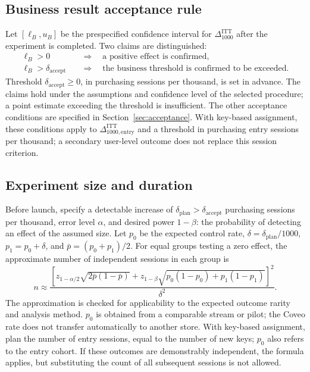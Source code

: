 \documentclass[12pt,a4paper]{article}
\theoremstyle{plainru}
\begin{document}
\subsection{Business result acceptance rule}\label{sec:eval-acceptance}

Let $[\ell_B,u_B]$ be the prespecified confidence interval
for $\Delta_{1000}^{\mathrm{ITT}}$ after the experiment is completed.
Two claims are distinguished:
\begin{align}
 \ell_B>0
 &\quad\Longrightarrow\quad
 \text{a positive effect is confirmed},
 \label{eq:eval-positive-acceptance}\\
 \ell_B>\delta_{\mathrm{accept}}
 &\quad\Longrightarrow\quad
 \text{the business threshold is confirmed to be exceeded}.
 \label{eq:eval-business-acceptance}
\end{align}
Threshold $\delta_{\mathrm{accept}}\ge0$, in purchasing sessions per thousand,
is set in advance. The claims hold under the assumptions and confidence level
of the selected procedure; a point estimate exceeding the threshold is insufficient.
The other acceptance conditions are specified in Section~\ref{sec:acceptance}.
With key-based assignment, these conditions apply to
$\Delta_{1000,\mathrm{entry}}^{\mathrm{ITT}}$ and a threshold in purchasing
entry sessions per thousand; a secondary user-level outcome
does not replace this session criterion.

\subsection{Experiment size and duration}\label{sec:eval-power}

Before launch, specify a detectable increase of
$\delta_{\mathrm{plan}}>\delta_{\mathrm{accept}}$ purchasing sessions per thousand, error level $\alpha$,
and desired power $1-\beta$: the probability of detecting an effect
of the assumed size. Let $p_0$ be the expected control rate,
$\delta=\delta_{\mathrm{plan}}/1000$, $p_1=p_0+\delta$, and
$\bar p=(p_0+p_1)/2$.
For equal groups testing a zero effect, the approximate number
of independent sessions in each group is
\begin{equation}\label{eq:eval-sample-size}
 n\approx\frac{
 \left[z_{1-\alpha/2}\sqrt{2\bar p(1-\bar p)}
       +z_{1-\beta}\sqrt{p_0(1-p_0)+p_1(1-p_1)}\right]^2}
 {\delta^2}.
\end{equation}
The approximation is checked for applicability to the expected outcome rarity
and analysis method. $p_0$ is obtained from a comparable stream or pilot;
the Coveo rate does not transfer automatically to another store.
With key-based assignment, plan the number of entry sessions, equal to the number
of new keys; $p_0$ also refers to the entry cohort. If
these outcomes are demonstrably independent, the formula applies, but substituting the count
of all subsequent sessions is not allowed.
\end{document}
